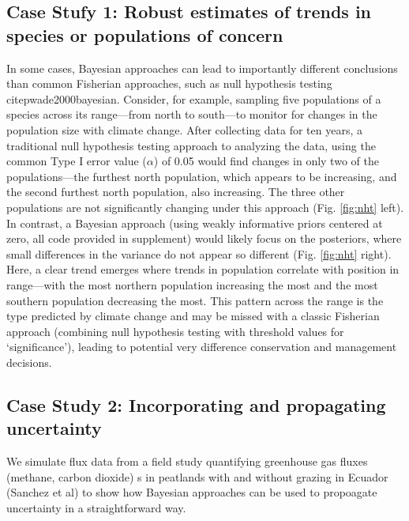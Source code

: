 \documentclass{article}
\begin{document}
\subsection*{Case Stufy 1: Robust estimates of trends in species or populations of concern}
\par In some cases, Bayesian approaches can lead to importantly different conclusions than common Fisherian approaches, such as null hypothesis testing citep{wade2000bayesian}. Consider, for example, sampling five populations of a species across its range---from north to south---to monitor for changes in the population size with climate change. After collecting data for ten years, a traditional null hypothesis testing approach to analyzing the data, using the common Type I error value ($\alpha$) of 0.05 would find changes in only two of the populations---the furthest north population, which appears to be increasing, and the second furthest north population, also increasing. The three other populations are not significantly changing under this approach (Fig. \ref{fig:nht} left). In contrast, a Bayesian approach (using weakly informative priors centered at zero, all code provided in supplement) would likely focus on the posteriors, where small differences in the variance do not appear so different  (Fig. \ref{fig:nht} right). Here, a clear trend emerges where trends in population correlate with position in range---with the most northern population increasing the most and the most southern population decreasing the most. This pattern across the range is the type predicted by climate change and may be missed with a classic Fisherian approach (combining null hypothesis testing with threshold values for `significance'), leading to potential very difference conservation and management decisions. %


\subsection*{Case Study 2: Incorporating and propagating uncertainty}
\par We simulate flux data from a field study quantifying greenhouse gas fluxes (methane, carbon dioxide) s in peatlands with and without grazing in Ecuador (Sanchez et al) to show how Bayesian approaches can be used to propoagate uncertainty in a straightforward way. 
\end{document}
